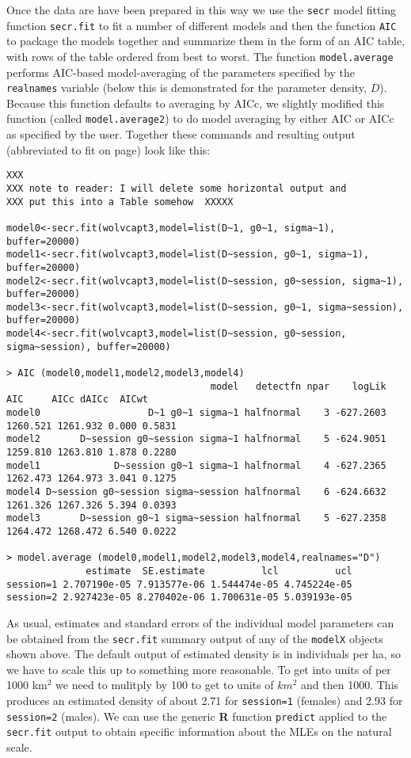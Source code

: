 Once the data are have been prepared in this way we use the
\mbox{\tt secr} model fitting function \mbox{\tt secr.fit} to fit a
number of different models and then the function \mbox{\tt AIC} to
package the models together and summarize them in the form of an AIC
table, with rows of the table ordered from best to worst. The function
\mbox{\tt model.average} performs AIC-based model-averaging of the
parameters specified by the \mbox{\tt realnames} variable (below this
is demonstrated for the parameter density, $D$).  Because this
function defaults to averaging by AICc, we slightly modified
this function (called \mbox{\tt model.average2}) to do model averaging
by either  AIC or AICc as specified by the user. Together
these commands and resulting output (abbreviated to fit on page) look like this:
{\small
\begin{verbatim}
XXX
XXX note to reader: I will delete some horizontal output and
XXX put this into a Table somehow  XXXXX

model0<-secr.fit(wolvcapt3,model=list(D~1, g0~1, sigma~1), buffer=20000)
model1<-secr.fit(wolvcapt3,model=list(D~session, g0~1, sigma~1), buffer=20000)
model2<-secr.fit(wolvcapt3,model=list(D~session, g0~session, sigma~1), buffer=20000)
model3<-secr.fit(wolvcapt3,model=list(D~session, g0~1, sigma~session), buffer=20000)
model4<-secr.fit(wolvcapt3,model=list(D~session, g0~session, sigma~session), buffer=20000)

> AIC (model0,model1,model2,model3,model4)
                                    model   detectfn npar    logLik      AIC     AICc dAICc  AICwt
model0                   D~1 g0~1 sigma~1 halfnormal    3 -627.2603 1260.521 1261.932 0.000 0.5831
model2       D~session g0~session sigma~1 halfnormal    5 -624.9051 1259.810 1263.810 1.878 0.2280
model1             D~session g0~1 sigma~1 halfnormal    4 -627.2365 1262.473 1264.973 3.041 0.1275
model4 D~session g0~session sigma~session halfnormal    6 -624.6632 1261.326 1267.326 5.394 0.0393
model3       D~session g0~1 sigma~session halfnormal    5 -627.2358 1264.472 1268.472 6.540 0.0222

> model.average (model0,model1,model2,model3,model4,realnames="D")
              estimate  SE.estimate          lcl          ucl
session=1 2.707190e-05 7.913577e-06 1.544474e-05 4.745224e-05
session=2 2.927423e-05 8.270402e-06 1.700631e-05 5.039193e-05
\end{verbatim}
}
As usual, estimates and standard errors of the individual model
parameters can be obtained from the \mbox{\tt secr.fit} summary output
of any of the \mbox{\tt modelX} objects shown above.
The default output of estimated density is in individuals per ha, so
we have to scale this up to something more reasonable. To get into
units of per 1000 km$^2$ we need to mulitply by 100 to get to units of
$km^2$ and then 1000. This produces an estimated density of
about 2.71 for \mbox{\tt session=1} (females) and 2.93 for
\mbox{\tt session=2} (males).  We can use the generic {\bf R} function
\mbox{\tt predict} applied to the \mbox{\tt secr.fit} output to obtain
 specific information about the MLEs on the natural scale.

